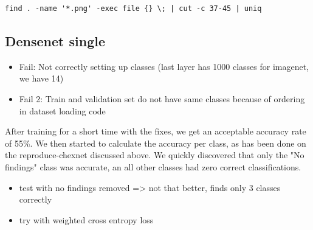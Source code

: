 \begin{verbatim}
find . -name '*.png' -exec file {} \; | cut -c 37-45 | uniq
\end{verbatim}

\subsection{Densenet single}

\begin{itemize}
    \item Fail: Not correctly setting up classes (last layer has 1000 classes for imagenet, we have 14)
    \item Fail 2: Train and validation set do not have same classes because of ordering in dataset loading code
\end{itemize}

After training for a short time with the fixes, we get an acceptable accuracy rate of 55\%. We then started to calculate the accuracy per class, as has been done on the reproduce-chexnet discussed above. We quickly discovered that only the "No findings" class was accurate, an all other classes had zero correct classifications.

\begin{itemize}
    \item test with no findings removed => not that better, finds only 3 classes correctly
    \item try with weighted cross entropy loss
\end{itemize}
